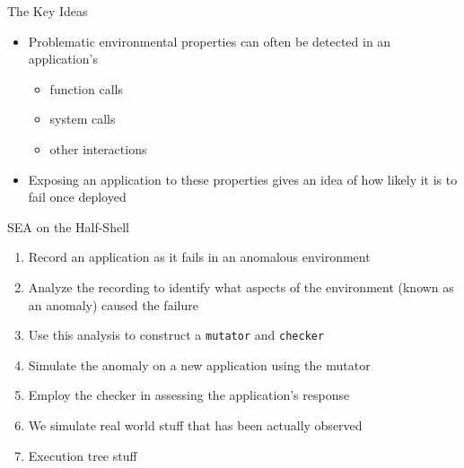 \documentclass[pdf]{beamer}
\begin{document}
\begin{frame}{The Key Ideas}
  \begin{itemize}
    \item{Problematic environmental properties can often be detected in an
      application's}
      \begin{itemize}
        \item{function calls}
        \item{system calls}
        \item{other interactions}
      \end{itemize}
    \item{Exposing an application to these properties gives an idea of how
      likely it is to fail once deployed}
  \end{itemize}
\end{frame}


\begin{frame}{SEA on the Half-Shell}

  \begin{enumerate}
    \item{Record an application as it fails in an anomalous environment}
    \item{Analyze the recording to identify what aspects of the environment
      (known as an anomaly) caused the failure}
    \item{Use this analysis to construct a {\tt mutator} and {\tt checker}}
    \item{Simulate the anomaly on a new application using the mutator}
    \item{Employ the checker in assessing the application's response}

    \item{We simulate real world stuff that has been actually observed}
    \item{Execution tree stuff }
  \end{enumerate}
\end{frame}
\end{document}
